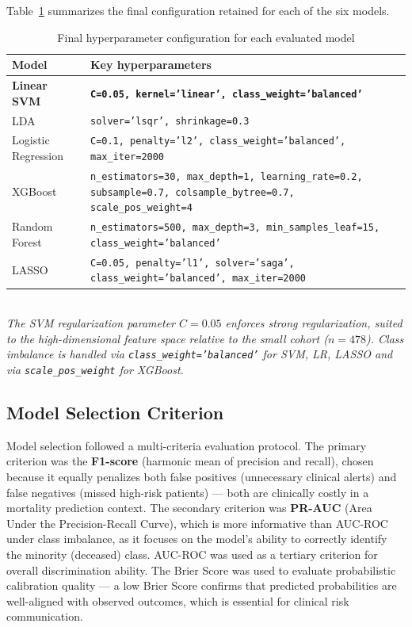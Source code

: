 \documentclass[12pt,a4paper,twoside]{report}
\begin{document}
Table~\ref{tab:hyperparams} summarizes the final configuration retained for each of the six models.

\begin{table}[htbp]
\centering
\small
\caption{Final hyperparameter configuration for each evaluated model}
\label{tab:hyperparams}
\begin{tabularx}{\textwidth}{p{3.8cm}X}
\toprule
\textbf{Model} & \textbf{Key hyperparameters} \\
\midrule
\textbf{Linear SVM} & \textbf{\texttt{C=0.05, kernel='linear', class\_weight='balanced'}} \\
LDA & \texttt{solver='lsqr', shrinkage=0.3} \\
Logistic Regression & \texttt{C=0.1, penalty='l2', class\_weight='balanced', max\_iter=2000} \\
XGBoost & \texttt{n\_estimators=30, max\_depth=1, learning\_rate=0.2, subsample=0.7, colsample\_bytree=0.7, scale\_pos\_weight=4} \\
Random Forest & \texttt{n\_estimators=500, max\_depth=3, min\_samples\_leaf=15, class\_weight='balanced'} \\
LASSO & \texttt{C=0.05, penalty='l1', solver='saga', class\_weight='balanced', max\_iter=2000} \\
\bottomrule
\end{tabularx}
\smallskip\\
\footnotesize\textit{The SVM regularization parameter $C=0.05$ enforces strong regularization, suited to the high-dimensional feature space relative to the small cohort ($n=478$). Class imbalance is handled via \texttt{class\_weight='balanced'} for SVM, LR, LASSO and via \texttt{scale\_pos\_weight} for XGBoost.}
\end{table}

\subsection{Model Selection Criterion}

Model selection followed a multi-criteria evaluation protocol. The primary criterion was the \textbf{F1-score} (harmonic mean of precision and recall), chosen because it equally penalizes both false positives (unnecessary clinical alerts) and false negatives (missed high-risk patients) — both are clinically costly in a mortality prediction context. The secondary criterion was \textbf{PR-AUC} (Area Under the Precision-Recall Curve), which is more informative than AUC-ROC under class imbalance, as it focuses on the model's ability to correctly identify the minority (deceased) class. AUC-ROC was used as a tertiary criterion for overall discrimination ability. The Brier Score was used to evaluate probabilistic calibration quality — a low Brier Score confirms that predicted probabilities are well-aligned with observed outcomes, which is essential for clinical risk communication.
\end{document}
